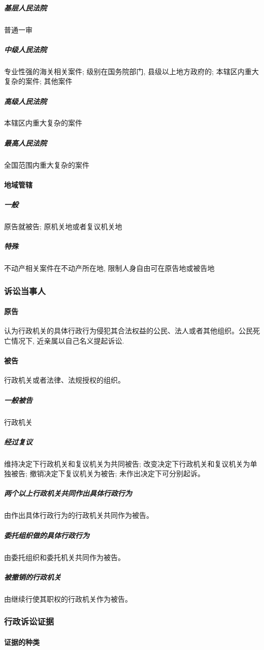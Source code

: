 \subparagraph{基层人民法院} 普通一审

\subparagraph{中级人民法院} 专业性强的海关相关案件; 级别在国务院部门, 县级以上地方政府的; 本辖区内重大复杂的案件; 其他案件

\subparagraph{高级人民法院} 本辖区内重大复杂的案件

\subparagraph{最高人民法院} 全国范围内重大复杂的案件

\paragraph{地域管辖}

\subparagraph{一般} 原告就被告; 原机关地或者复议机关地

\subparagraph{特殊} 不动产相关案件在不动产所在地, 限制人身自由可在原告地或被告地

\subsubsection{诉讼当事人}

\paragraph{原告} 认为行政机关的具体行政行为侵犯其合法权益的公民、法人或者其他组织。公民死亡情况下, 近亲属以自己名义提起诉讼.

\paragraph{被告} 行政机关或者法律、法规授权的组织。

\subparagraph{一般被告} 行政机关

\subparagraph{经过复议} 维持决定下行政机关和复议机关为共同被告; 改变决定下行政机关和复议机关为单独被告; 撤销决定下复议机关为被告; 未作出决定下可分别起诉。

\subparagraph{两个以上行政机关共同作出具体行政行为} 由作出具体行政行为的行政机关共同作为被告。

\subparagraph{委托组织做的具体行政行为} 由委托组织和委托机关共同作为被告。

\subparagraph{被撤销的行政机关} 由继续行使其职权的行政机关作为被告。

\subsubsection{行政诉讼证据}

\paragraph{证据的种类}

